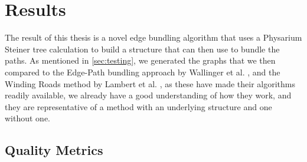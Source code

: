 
\chapter{Results}
\label{chap:Results}

The result of this thesis is a novel edge bundling algorithm that uses a Physarium Steiner tree calculation to build a structure that can then use to bundle the paths. As mentioned in \autoref{sec:testing}, we generated the graphs that we then compared to the Edge-Path bundling approach by Wallinger et al. \cite{wallinger_edge-path_2022}, and the Winding Roads method by Lambert et al. \cite{lambert_winding_2010}, as these have made their algorithms readily available, we already have a good understanding of how they work, and they are representative of a method with an underlying structure and one without one.


\section{Quality Metrics}

